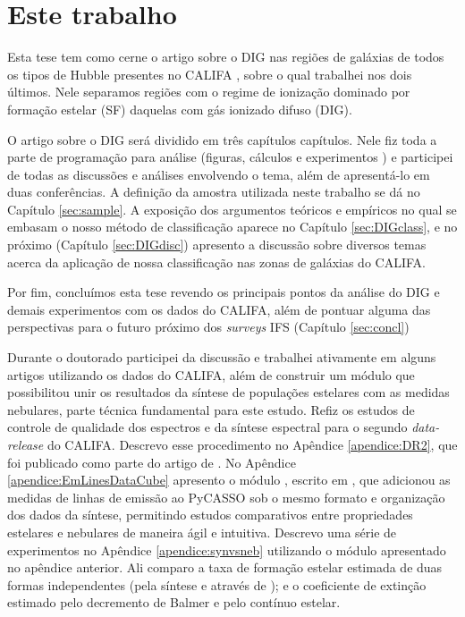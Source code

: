 \section{Este trabalho}
\label{sec:intro:estetrabalho}

Esta tese tem como cerne o artigo sobre o DIG nas regiões de galáxias de todos os tipos de Hubble presentes no CALIFA  \citep[][Apêndice \ref{apendice:DIGpaper0}]{Lacerda.etal.2018}, sobre o qual trabalhei nos dois últimos. Nele separamos regiões com o regime de ionização dominado por formação estelar (SF) daquelas com gás ionizado difuso (DIG).

O artigo sobre o DIG será dividido em três capítulos capítulos. Nele fiz toda a parte de programação para análise (figuras, cálculos e experimentos
) e participei de todas as discussões e análises envolvendo o tema, além de apresentá-lo em duas conferências. A definição da amostra utilizada neste trabalho se dá no Capítulo \ref{sec:sample}. A exposição dos argumentos teóricos e empíricos no qual se embasam o nosso método de classificação aparece no Capítulo \ref{sec:DIGclass}, e no próximo (Capítulo \ref{sec:DIGdisc}) apresento a discussão sobre diversos temas acerca da aplicação de nossa classificação nas zonas de galáxias do CALIFA.

Por fim, concluímos esta tese revendo os principais pontos da análise do DIG e demais experimentos com os dados do CALIFA, além de pontuar alguma das perspectivas para o futuro próximo dos {\em surveys} IFS (Capítulo \ref{sec:concl}) 

Durante o doutorado participei da discussão e trabalhei ativamente em alguns artigos utilizando os dados do CALIFA, além de construir um módulo que possibilitou unir os resultados da síntese de populações estelares com as medidas nebulares, parte técnica fundamental para este estudo. Refiz os estudos de controle de qualidade dos espectros e da síntese espectral para o segundo {\em data-release} do CALIFA. Descrevo esse procedimento no Apêndice \ref{apendice:DR2}, que foi publicado como parte do artigo de \citet[][Apêndice \ref{apendice:GBetal2015a}]{GarciaBenito.etal.2015a}. No Apêndice \ref{apendice:EmLinesDataCube} apresento o módulo \emldc, escrito em \pyt, que adicionou as medidas de linhas de emissão ao PyCASSO sob o mesmo formato e organização dos dados da síntese, permitindo estudos comparativos entre propriedades estelares e nebulares de maneira ágil e intuitiva. Descrevo uma série de experimentos no Apêndice \ref{apendice:synvsneb} utilizando o módulo apresentado no apêndice anterior. Ali comparo a taxa de formação estelar estimada de duas formas independentes (pela síntese e através de \Ha); e o coeficiente de extinção estimado pelo decremento de Balmer e pelo contínuo estelar.

